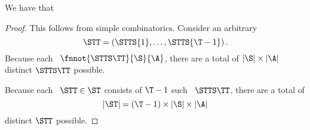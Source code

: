 \begin{proposition}
  \nrp
  We have that %
\end{proposition}

\begin{proof}
  \nrp
  This follows from simple combinatorics.
  Consider an arbitrary \str
  $$\STT = \left(\STTS{1},\ldots,\STTS{\T - 1}\right).$$
  Because each \stpstr\ $\fnnot{\STTS\TT}{\S}{\A}$,
  there are a total of $|\S| \times |\A|$ distinct $\STTS\TT$ possible.

  \nrp
  Because each \str\ $\STT \in \ST$ consists of $\T - 1$ such \stpstrs\ $\STTS\TT$,
  there are a total of 
  $$|\ST| = (\T - 1) \times |\S| \times |\A|$$
  distinct $\STT$ possible.
\end{proof}
